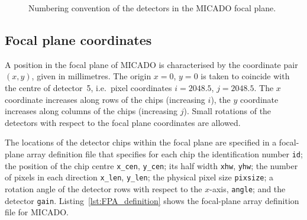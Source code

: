 \documentclass[a4paper,twoside,11pt]{article}
\begin{document}
\begin{figure}[b]
  \centering
  \caption{Numbering convention of the detectors in the MICADO focal
    plane.}
  \label{fig:detector_layout}
\end{figure}

\subsection{Focal plane coordinates}

A position in the focal plane of MICADO is characterised by the
coordinate pair $(x, y)$, given in millimetres. The origin $x=0$,
$y=0$ is taken to coincide with the centre of detector~5, i.e.~pixel
coordinates $i=2048.5$, $j=2048.5$. The $x$ coordinate increases along
rows of the chips (increasing $i$), the $y$ coordinate increases along
columns of the chips (increasing $j$). Small rotations of the
detectors with respect to the focal plane coordinates are allowed.

The locations of the detector chips within the focal plane are
specified in a focal-plane array definition file that specifies for
each chip the identification number \lstinline{id}; the position of
the chip centre \lstinline{x_cen}, \lstinline{y_cen}; its half width
\lstinline{xhw}, \lstinline{yhw}; the number of pixels in each
direction \lstinline{x_len}, \lstinline{y_len}; the physical pixel
size \lstinline{pixsize}; a rotation angle of the detector rows with
respect to the $x$-axis, \lstinline{angle}; and the detector
\lstinline{gain}.  Listing~\ref{lst:FPA_definition} shows the
focal-plane array definition file for MICADO.
\end{document}
